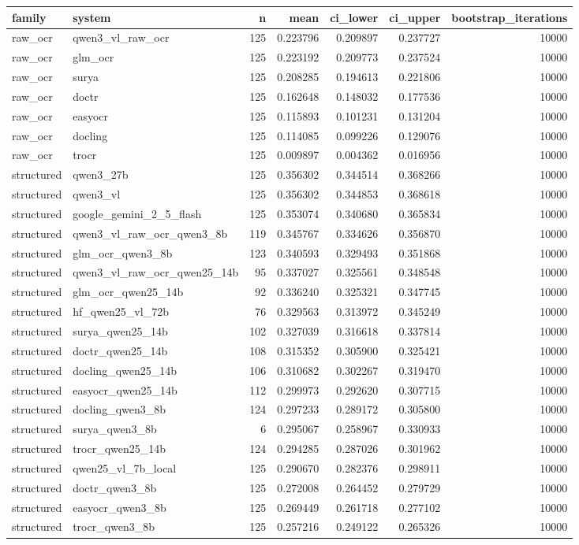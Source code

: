 \begin{tabular}{llrrrrr}
\toprule
family & system & n & mean & ci\_lower & ci\_upper & bootstrap\_iterations \\
\midrule
raw\_ocr & qwen3\_vl\_raw\_ocr & 125 & 0.223796 & 0.209897 & 0.237727 & 10000 \\
raw\_ocr & glm\_ocr & 125 & 0.223192 & 0.209773 & 0.237524 & 10000 \\
raw\_ocr & surya & 125 & 0.208285 & 0.194613 & 0.221806 & 10000 \\
raw\_ocr & doctr & 125 & 0.162648 & 0.148032 & 0.177536 & 10000 \\
raw\_ocr & easyocr & 125 & 0.115893 & 0.101231 & 0.131204 & 10000 \\
raw\_ocr & docling & 125 & 0.114085 & 0.099226 & 0.129076 & 10000 \\
raw\_ocr & trocr & 125 & 0.009897 & 0.004362 & 0.016956 & 10000 \\
structured & qwen3\_27b & 125 & 0.356302 & 0.344514 & 0.368266 & 10000 \\
structured & qwen3\_vl & 125 & 0.356302 & 0.344853 & 0.368618 & 10000 \\
structured & google\_gemini\_2\_5\_flash & 125 & 0.353074 & 0.340680 & 0.365834 & 10000 \\
structured & qwen3\_vl\_raw\_ocr\_qwen3\_8b & 119 & 0.345767 & 0.334626 & 0.356870 & 10000 \\
structured & glm\_ocr\_qwen3\_8b & 123 & 0.340593 & 0.329493 & 0.351868 & 10000 \\
structured & qwen3\_vl\_raw\_ocr\_qwen25\_14b & 95 & 0.337027 & 0.325561 & 0.348548 & 10000 \\
structured & glm\_ocr\_qwen25\_14b & 92 & 0.336240 & 0.325321 & 0.347745 & 10000 \\
structured & hf\_qwen25\_vl\_72b & 76 & 0.329563 & 0.313972 & 0.345249 & 10000 \\
structured & surya\_qwen25\_14b & 102 & 0.327039 & 0.316618 & 0.337814 & 10000 \\
structured & doctr\_qwen25\_14b & 108 & 0.315352 & 0.305900 & 0.325421 & 10000 \\
structured & docling\_qwen25\_14b & 106 & 0.310682 & 0.302267 & 0.319470 & 10000 \\
structured & easyocr\_qwen25\_14b & 112 & 0.299973 & 0.292620 & 0.307715 & 10000 \\
structured & docling\_qwen3\_8b & 124 & 0.297233 & 0.289172 & 0.305800 & 10000 \\
structured & surya\_qwen3\_8b & 6 & 0.295067 & 0.258967 & 0.330933 & 10000 \\
structured & trocr\_qwen25\_14b & 124 & 0.294285 & 0.287026 & 0.301962 & 10000 \\
structured & qwen25\_vl\_7b\_local & 125 & 0.290670 & 0.282376 & 0.298911 & 10000 \\
structured & doctr\_qwen3\_8b & 125 & 0.272008 & 0.264452 & 0.279729 & 10000 \\
structured & easyocr\_qwen3\_8b & 125 & 0.269449 & 0.261718 & 0.277102 & 10000 \\
structured & trocr\_qwen3\_8b & 125 & 0.257216 & 0.249122 & 0.265326 & 10000 \\
\bottomrule
\end{tabular}
